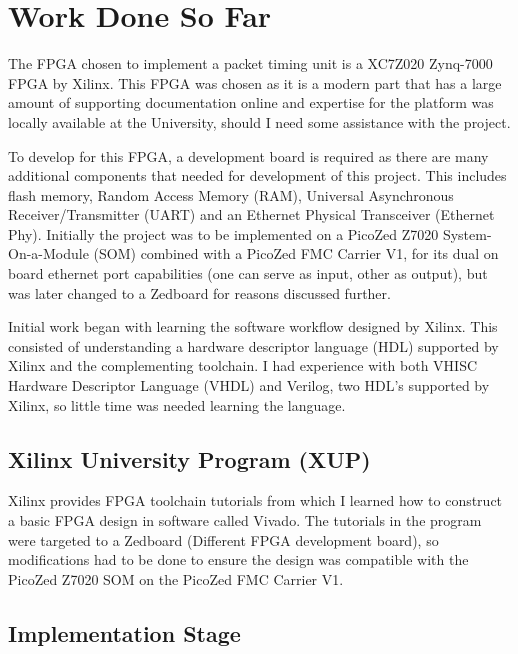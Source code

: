 \chapter{Work Done So Far}\label{C:workDoneSoFar}

\par The FPGA chosen to implement a packet timing unit is a XC7Z020 Zynq-7000 FPGA by Xilinx. This
FPGA was chosen as it is a modern part that has a large amount of supporting documentation online
and expertise for the platform was locally available at the University, should I need some assistance
with the project.

\par To develop for this FPGA, a development board is required as there are many additional components
that needed for development of this project. This includes flash memory, Random Access Memory
(RAM), Universal Asynchronous Receiver/Transmitter (UART) and an Ethernet Physical Transceiver
(Ethernet Phy). Initially the project was to be implemented on a PicoZed Z7020 System-On-a-Module
(SOM) combined with a PicoZed FMC Carrier V1, for its dual on board ethernet port capabilities (one
can serve as input, other as output), but was later changed to a Zedboard for reasons discussed
further.

\par Initial work began with learning the software workflow designed by Xilinx. This consisted of
understanding a hardware descriptor language (HDL) supported by Xilinx and the complementing
toolchain. I had experience with both VHISC Hardware Descriptor Language (VHDL) and Verilog, two
HDL's supported by Xilinx, so little time was needed learning the language.

\section{Xilinx University Program (XUP)}

Xilinx provides FPGA toolchain tutorials from which I learned how to construct a basic FPGA design in
software called Vivado. The tutorials in the program were targeted to a Zedboard (Different FPGA
development board), so modifications had to be done to ensure the design was compatible with the
PicoZed Z7020 SOM on the PicoZed FMC Carrier V1.

\section{Implementation Stage}

